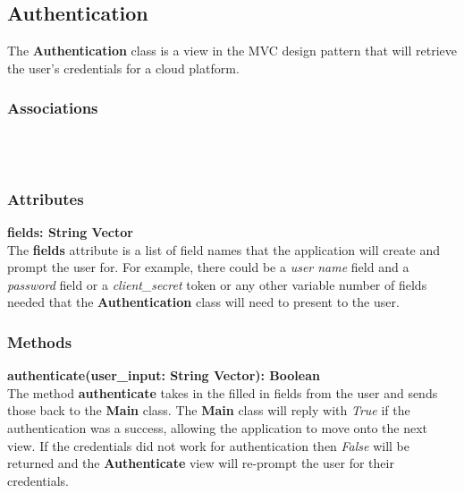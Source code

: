 \subsection{Authentication}
The \textbf{Authentication} class is a view in the MVC design pattern that will retrieve the user's
credentials for a cloud platform.

\subsubsection{Associations}
\textbf{} \\

\textbf{} \\

\subsubsection{Attributes}
\textbf{fields: String Vector} \\
The \textbf{fields} attribute is a list of field names that the application will create and prompt the user
for. For example, there could be a \textit{user name} field and a \textit{password} field or a \textit{
client\_secret} token or any other variable number of fields needed that the \textbf{Authentication} class
will need to present to the user.

\subsubsection{Methods}
\textbf{authenticate(user\_input: String Vector): Boolean} \\
The method \textbf{authenticate} takes in the filled in fields from the user and sends those back to the
\textbf{Main} class. The \textbf{Main} class will reply with \textit{True} if the authentication was a
success, allowing the application to move onto the next view. If the credentials did not work for
authentication then \textit{False} will be returned and the \textbf{Authenticate} view will re-prompt the user
for their credentials.
  
